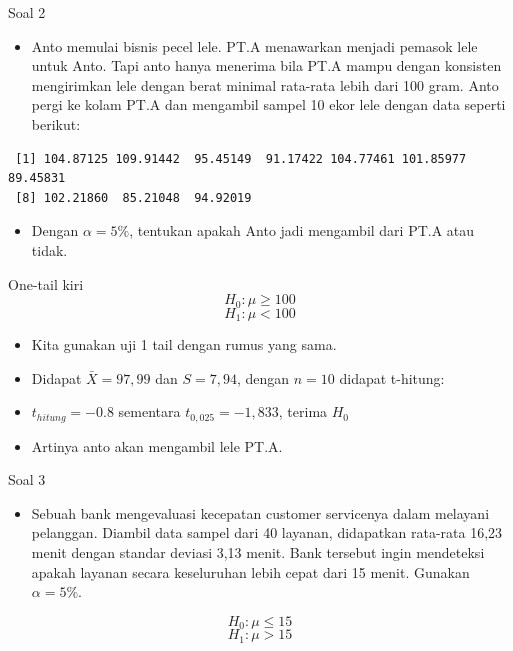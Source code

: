 \documentclass[
  ignorenonframetext,
]{beamer}
\providecommand{\tightlist}{%
  \setlength{\itemsep}{0pt}\setlength{\parskip}{0pt}}\usepackage{longtable,booktabs,array}
\begin{document}
\begin{frame}[fragile]{Soal 2}
\label{soal-2}
\begin{itemize}
\tightlist
\item
  Anto memulai bisnis pecel lele. PT.A menawarkan menjadi pemasok lele
  untuk Anto. Tapi anto hanya menerima bila PT.A mampu dengan konsisten
  mengirimkan lele dengan berat minimal rata-rata lebih dari 100 gram.
  Anto pergi ke kolam PT.A dan mengambil sampel 10 ekor lele dengan data
  seperti berikut:
\end{itemize}

\begin{verbatim}
 [1] 104.87125 109.91442  95.45149  91.17422 104.77461 101.85977  89.45831
 [8] 102.21860  85.21048  94.92019
\end{verbatim}

\begin{itemize}
\tightlist
\item
  Dengan \(\alpha=5\%\), tentukan apakah Anto jadi mengambil dari PT.A
  atau tidak.
\end{itemize}
\end{frame}

\begin{frame}{One-tail kiri}
\label{one-tail-kiri}
\[
H_0: \mu \geq 100
\] \[
H_1: \mu < 100
\]

\begin{itemize}
\item
  Kita gunakan uji 1 tail dengan rumus yang sama.
\item
  Didapat \(\bar{X}=97,99\) dan \(S=7,94\), dengan \(n=10\) didapat
  t-hitung:
\item
  \(t_{hitung}=-0.8\) sementara \(t_{0,025}=-1,833\), terima \(H_0\)
\item
  Artinya anto akan mengambil lele PT.A.
\end{itemize}
\end{frame}

\begin{frame}{Soal 3}
\label{soal-3}
\begin{itemize}
\tightlist
\item
  Sebuah bank mengevaluasi kecepatan customer servicenya dalam melayani
  pelanggan. Diambil data sampel dari 40 layanan, didapatkan rata-rata
  16,23 menit dengan standar deviasi 3,13 menit. Bank tersebut ingin
  mendeteksi apakah layanan secara keseluruhan lebih cepat dari 15
  menit. Gunakan \(\alpha=5\%\).
\end{itemize}

\[
H_0: \mu\leq15
\] \[
H_1: \mu>15
\]
\end{frame}
\end{document}
